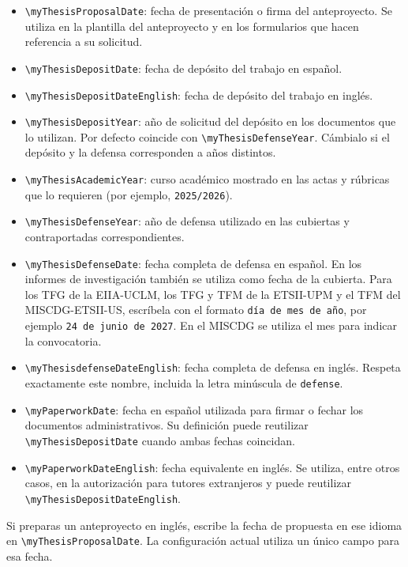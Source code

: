 \begin{itemize}
  \item \texttt{\textbackslash{}myThesisProposalDate}: fecha de presentación o firma del anteproyecto. Se utiliza en la plantilla del anteproyecto y en los formularios que hacen referencia a su solicitud.
  \item \texttt{\textbackslash{}myThesisDepositDate}: fecha de depósito del trabajo en español.
  \item \texttt{\textbackslash{}myThesisDepositDateEnglish}: fecha de depósito del trabajo en inglés.
  \item \texttt{\textbackslash{}myThesisDepositYear}: año de solicitud del depósito en los documentos que lo utilizan. Por defecto coincide con \texttt{\textbackslash{}myThesisDefenseYear}. Cámbialo si el depósito y la defensa corresponden a años distintos.
  \item \texttt{\textbackslash{}myThesisAcademicYear}: curso académico mostrado en las actas y rúbricas que lo requieren (por ejemplo, \texttt{2025/2026}).
  \item \texttt{\textbackslash{}myThesisDefenseYear}: año de defensa utilizado en las cubiertas y contraportadas correspondientes.
  \item \texttt{\textbackslash{}myThesisDefenseDate}: fecha completa de defensa en español. En los informes de investigación también se utiliza como fecha de la cubierta. Para los TFG de la EIIA-UCLM, los TFG y TFM de la ETSII-UPM y el TFM del MISCDG-ETSII-US, escríbela con el formato \texttt{día de mes de año}, por ejemplo \texttt{24 de junio de 2027}. En el MISCDG se utiliza el mes para indicar la convocatoria.
  \item \texttt{\textbackslash{}myThesisdefenseDateEnglish}: fecha completa de defensa en inglés. Respeta exactamente este nombre, incluida la letra minúscula de \texttt{defense}.
  \item \texttt{\textbackslash{}myPaperworkDate}: fecha en español utilizada para firmar o fechar los documentos administrativos. Su definición puede reutilizar \texttt{\textbackslash{}myThesisDepositDate} cuando ambas fechas coincidan.
  \item \texttt{\textbackslash{}myPaperworkDateEnglish}: fecha equivalente en inglés. Se utiliza, entre otros casos, en la autorización para tutores extranjeros y puede reutilizar \texttt{\textbackslash{}myThesisDepositDateEnglish}.
\end{itemize}

Si preparas un anteproyecto en inglés, escribe la fecha de propuesta en ese idioma en \texttt{\textbackslash{}myThesisProposalDate}. La configuración actual utiliza un único campo para esa fecha.


